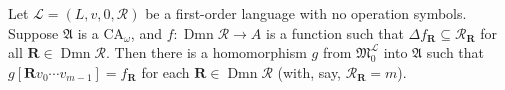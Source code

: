 Let $\mathcal{L} = (L, v, 0, \mathcal{R})$ be a first-order language with no operation symbols. Suppose $\mathfrak{A}$ is a $\mathrm{CA}_\omega$, and $f \colon \operatorname{Dmn} \mathcal{R} \to A$ is a function such that $\Delta f_{\mathbf{R}} \subseteq \mathcal{R}_{\mathbf{R}}$ for all $\mathbf{R} \in \operatorname{Dmn} \mathcal{R}$. Then there is a homomorphism $g$ from $\mathfrak{M}_0^{\mathcal{L}}$ into $\mathfrak{A}$ such that $g[\mathbf{R}v_0 \cdots v_{m-1}] = f_{\mathbf{R}}$ for each $\mathbf{R} \in \operatorname{Dmn} \mathcal{R}$ (with, say, $\mathcal{R}_{\mathbf{R}} = m$).
